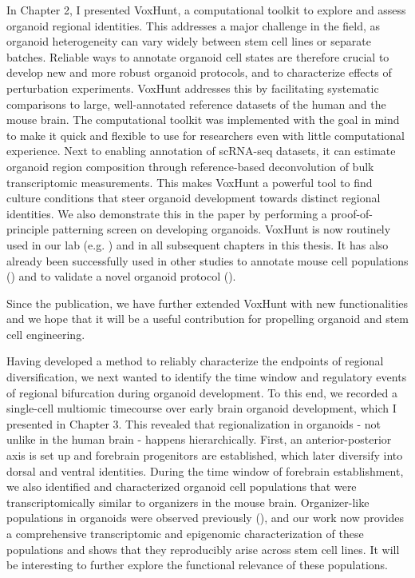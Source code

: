 In Chapter 2, I presented VoxHunt, a computational toolkit to explore and assess organoid regional identities. This addresses a major challenge in the field, as organoid heterogeneity can vary widely between stem cell lines or separate batches. Reliable ways to annotate organoid cell states are therefore crucial to develop new and more robust organoid protocols, and to characterize effects of perturbation experiments. VoxHunt addresses this by facilitating systematic comparisons to large, well-annotated reference datasets of the human and the mouse brain. The computational toolkit was implemented with the goal in mind to make it quick and flexible to use for researchers even with little computational experience. Next to enabling annotation of scRNA-seq datasets, it can estimate organoid region composition through reference-based deconvolution of bulk transcriptomic measurements. This makes VoxHunt a powerful tool to find culture conditions that steer organoid development towards distinct regional identities. We also demonstrate this in the paper by performing a proof-of-principle patterning screen on developing organoids. VoxHunt is now routinely used in our lab (e.g. \cite{kanton_organoid_2019,he_lineage_2022}) and in all subsequent chapters in this thesis. It has also already been successfully used in other studies to annotate mouse cell populations (\cite{la_manno_molecular_2020}) and to validate a novel organoid protocol (\cite{miura_generation_2020}).

Since the publication, we have further extended VoxHunt with new functionalities and we hope that it will be a useful contribution for propelling organoid and stem cell engineering.

Having developed a method to reliably characterize the endpoints of regional diversification, we next wanted to identify the time window and regulatory events of regional bifurcation during organoid development. To this end, we recorded a single-cell multiomic timecourse over early brain organoid development, which I presented in Chapter 3. This revealed that regionalization in organoids - not unlike in the human brain - happens hierarchically. First, an anterior-posterior axis is set up and forebrain progenitors are established, which later diversify into dorsal and ventral identities. During the time window of forebrain establishment, we also identified and characterized organoid cell populations that were transcriptomically similar to organizers in the mouse brain. Organizer-like populations in organoids were observed previously (\cite{renner_self-organized_2017}), and our work now provides a comprehensive transcriptomic and epigenomic characterization of these populations and shows that they reproducibly arise across stem cell lines. It will be interesting to further explore the functional relevance of these populations. 

